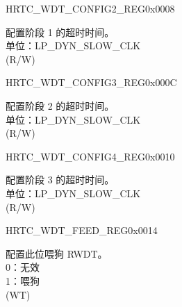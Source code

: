 \begin{register}{H}{RTC\_WDT\_CONFIG2\_REG}{0x0008}\label{regdesc:RTCWDTCONFIG2REG}
%
\regnewline%
\begin{regdesc}\begin{reglist}
\label{fielddesc:RTCWDTSTG1HOLD}\item [RTC\_WDT\_STG1\_HOLD] 配置阶段 1 的超时时间。\\
单位：LP\_DYN\_SLOW\_CLK  \\ (R/W)
\end{reglist}\end{regdesc}
\end{register}


\begin{register}{H}{RTC\_WDT\_CONFIG3\_REG}{0x000C}\label{regdesc:RTCWDTCONFIG3REG}
%
\regnewline%
\begin{regdesc}\begin{reglist}
\label{fielddesc:RTCWDTSTG2HOLD}\item [RTC\_WDT\_STG2\_HOLD] 配置阶段 2 的超时时间。\\
单位：LP\_DYN\_SLOW\_CLK  \\ (R/W)
\end{reglist}\end{regdesc}
\end{register}


\begin{register}{H}{RTC\_WDT\_CONFIG4\_REG}{0x0010}\label{regdesc:RTCWDTCONFIG4REG}
%
\regnewline%
\begin{regdesc}\begin{reglist}
\label{fielddesc:RTCWDTSTG3HOLD}\item [RTC\_WDT\_STG3\_HOLD] 配置阶段 3 的超时时间。\\
单位：LP\_DYN\_SLOW\_CLK  \\ (R/W)
\end{reglist}\end{regdesc}
\end{register}

\begin{register}{H}{RTC\_WDT\_FEED\_REG}{0x0014}\label{regdesc:RTCWDTFEEDREG}
%
%
\regnewline%
\begin{regdesc}\begin{reglist}
\label{fielddesc:RTCWDTFEED}\item [RTC\_WDT\_FEED] 配置此位喂狗 RWDT。\\
0：无效 \\
1：喂狗  \\ (WT)
\end{reglist}\end{regdesc}
\end{register}


